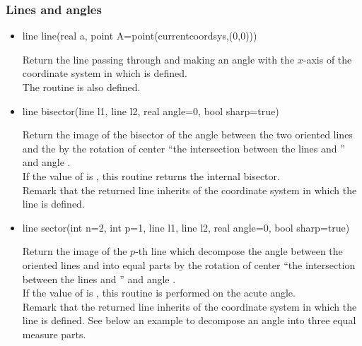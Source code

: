 \documentclass[pdftex]{article}
\begin{document}
\subsubsection{Lines and angles}
\begin{itemize}
\item {}%
  \begin{Vcolor}
    line line(real a, point A=point(currentcoordsys,(0,0)))
  \end{Vcolor}
  Return the line passing through  and making an
  angle  with the $x$-axis of the coordinate system in
  which  is defined.\\
  The routine  is also defined.
\item {}%
  \begin{Vcolor}
    line bisector(line l1, line l2, real angle=0, bool sharp=true)
  \end{Vcolor}
  Return the image of the bisector of the angle between the two oriented
  lines  and the  by the rotation of center ``the
  intersection between the lines  and '' and
  angle .\\
  If the value of  is , this routine returns
  the internal bisector.\\
  Remark that the returned line inherits of the coordinate system
  in which the line  is \hypertarget{bisectorline}{defined}.
\item {}%
  \begin{Vcolor}
    line sector(int n=2, int p=1, line l1, line l2, real angle=0, bool sharp=true)
  \end{Vcolor}
  Return the image of the $p$-th line which decompose the angle
  between the oriented lines  and  into 
  equal parts by the rotation of center  ``the
  intersection between the lines  and '' and
  angle .\\
  If the value of  is , this routine is
  performed on the acute angle.\\
  Remark that the returned line inherits of the coordinate system
  in which the line  is defined.
  See below an example to decompose an angle into three equal measure parts.

\end{itemize}
\end{document}
